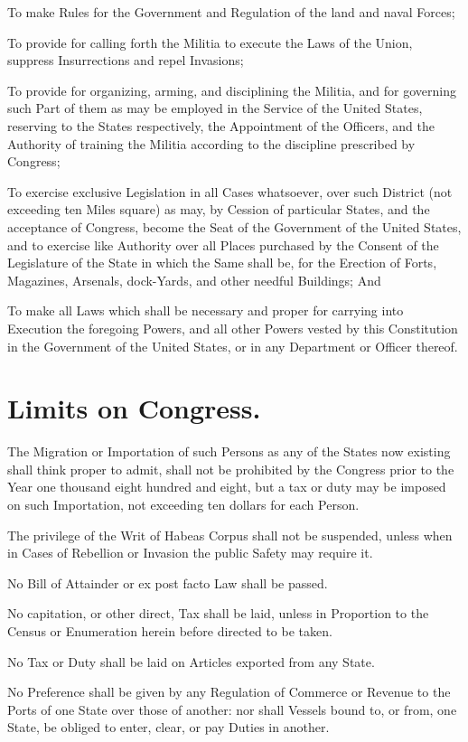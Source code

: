 \documentclass[12pt]{constitution}
\begin{document}
To make Rules for the Government and Regulation of the land and naval Forces;

To provide for calling forth the Militia to execute the Laws of the Union,
suppress Insurrections and repel Invasions;

To provide for organizing, arming, and disciplining the Militia, and for
governing such Part of them as may be employed in the Service of the United
States, reserving to the States respectively, the Appointment of the Officers,
and the Authority of training the Militia according to the discipline
prescribed by Congress;

To exercise exclusive Legislation in all Cases whatsoever, over such District
(not exceeding ten Miles square) as may, by Cession of particular States, and
the acceptance of Congress, become the Seat of the Government of the United
States, and to exercise like Authority over all Places purchased by the Consent
of the Legislature of the State in which the Same shall be, for the Erection of
Forts, Magazines, Arsenals, dock-Yards, and other needful Buildings; And

To make all Laws which shall be necessary and proper for carrying into
Execution the foregoing Powers, and all other Powers vested by this
Constitution in the Government of the United States, or in any Department or
Officer thereof.


\section{Limits on Congress.}
The Migration or Importation of such Persons as any of the States now existing
shall think proper to admit, shall not be prohibited by the Congress prior to
the Year one thousand eight hundred and eight, but a tax or duty may be imposed
on such Importation, not exceeding ten dollars for each Person.

The privilege of the Writ of Habeas Corpus shall not be suspended, unless when
in Cases of Rebellion or Invasion the public Safety may require it.

No Bill of Attainder or ex post facto Law shall be passed.

No capitation, or other direct, Tax shall be laid, unless in Proportion to the
Census or Enumeration herein before directed to be taken.

No Tax or Duty shall be laid on Articles exported from any State.

No Preference shall be given by any Regulation of Commerce or Revenue to the
Ports of one State over those of another: nor shall Vessels bound to, or from,
one State, be obliged to enter, clear, or pay Duties in another.
\end{document}
